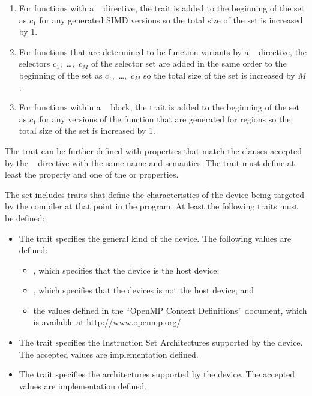 \begin{enumerate}
\item For functions with a ~ directive, the  trait
      is added to the beginning of the set as $c_{1}$ for any generated SIMD
      versions so the total size of the set is increased by 1.
\item For functions that are determined to be function variants by a
      ~ directive, the selectors 
      $c_{1}$,~\ldots,~$c_{M}$ of the  selector set are added
      in the same order to the beginning of the set as $c_{1}$,~\ldots,~$c_{M}$
      so the total size of the set is increased by $M$.
\item For functions within a ~ block, the 
      trait is added to the beginning of the set as $c_{1}$ for any versions of 
      the function that are generated for  regions so the total 
      size of the set is increased by 1.
\end{enumerate}

The  trait can be further defined with properties that match the
clauses accepted by the ~ directive with the same
name and semantics. The  trait must define at least the
 property and one of  the  or  properties.

The  set includes traits that define the characteristics of the 
device being targeted by the compiler at that point in the program. At least 
the following traits must be defined:

\begin{itemize}
\item The  trait specifies the general kind of the 
      device. The following  values are defined:

\begin{itemize}
\item {}, which specifies that the device is the host device;
\item {}, which specifies that the devices is not the host device; and
\item the values defined in the ``OpenMP Context Definitions'' document,
      which is available at \url{http://www.openmp.org/}.
\end{itemize}

\item The  trait specifies the Instruction Set 
      Architectures supported by the device. The accepted  
      values are implementation defined.
\item The  trait specifies the architectures 
     supported by the device. The accepted  values are 
      implementation defined.
\end{itemize}

